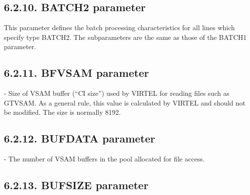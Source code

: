 \documentclass[letterpaper,10pt,english]{sphinxmanual}
\begin{document}
\subsection{6.2.10. BATCH2 parameter}
\label{\detokenize{Installation_Guide:batch2-parameter}}
\begin{sphinxVerbatim}[commandchars=\\\{\}]
    
\end{sphinxVerbatim}

This parameter defines the batch processing characteristics for all lines which specify type BATCH2. The subparameters are the same as those of the BATCH1 parameter.


\subsection{6.2.11. BFVSAM parameter}
\label{\detokenize{Installation_Guide:bfvsam-parameter}}
\begin{sphinxVerbatim}[commandchars=\\\{\}]
 
\end{sphinxVerbatim}

 - Size of VSAM buffer (“CI size”) used by VIRTEL for reading files such as GTVSAM. As a general rule, this value is calculated by VIRTEL and should not be modified. The size is normally 8192.


\subsection{6.2.12. BUFDATA parameter}
\label{\detokenize{Installation_Guide:bufdata-parameter}}
\begin{sphinxVerbatim}[commandchars=\\\{\}]
 
\end{sphinxVerbatim}

 - The number of VSAM buffers in the pool allocated for file access.


\subsection{6.2.13. BUFSIZE parameter}
\label{\detokenize{Installation_Guide:bufsize-parameter}}
\begin{sphinxVerbatim}[commandchars=\\\{\}]
 
\end{sphinxVerbatim}
\end{document}
